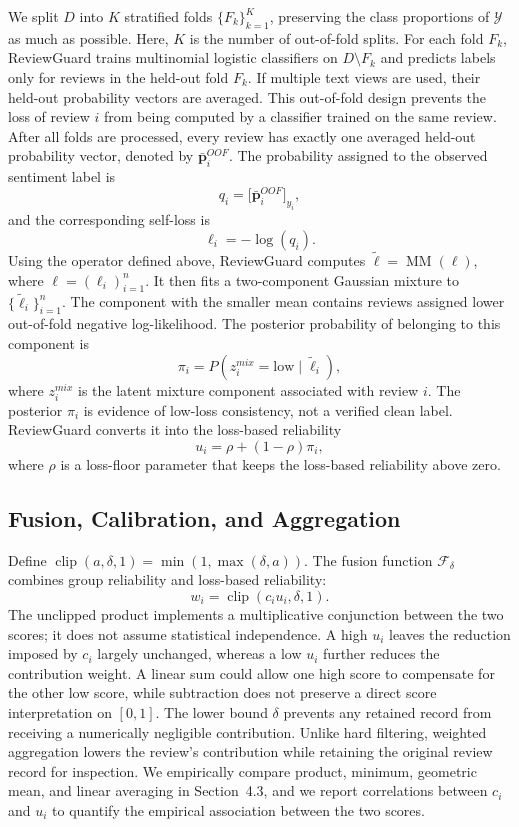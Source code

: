\documentclass[runningheads]{llncs}
\begin{document}
We split \(D\) into \(K\) stratified folds \(\{F_k\}_{k=1}^{K}\), preserving the class proportions of \(\mathcal{Y}\) as much as possible. Here, \(K\) is the number of out-of-fold splits. For each fold \(F_k\), ReviewGuard trains multinomial logistic classifiers on \(D\setminus F_k\) and predicts labels only for reviews in the held-out fold \(F_k\). If multiple text views are used, their held-out probability vectors are averaged. This out-of-fold design prevents the loss of review \(i\) from being computed by a classifier trained on the same review. After all folds are processed, every review has exactly one averaged held-out probability vector, denoted by \(\bar{\mathbf{p}}_i^{OOF}\). The probability assigned to the observed sentiment label is
\[
q_i=\bigl[\bar{\mathbf{p}}_i^{OOF}\bigr]_{y_i},
\]
and the corresponding self-loss is
\[
\ell_i=-\log(q_i).
\]
Using the operator defined above, ReviewGuard computes \(\tilde{\boldsymbol{\ell}}=\operatorname{MM}(\boldsymbol{\ell})\), where \(\boldsymbol{\ell}=(\ell_i)_{i=1}^{n}\). It then fits a two-component Gaussian mixture to \(\{\tilde{\ell}_i\}_{i=1}^{n}\). The component with the smaller mean contains reviews assigned lower out-of-fold negative log-likelihood. The posterior probability of belonging to this component is
\[
\pi_i=P(z_i^{mix}=\mathrm{low}\mid \tilde{\ell}_i),
\]
where \(z_i^{mix}\) is the latent mixture component associated with review \(i\). The posterior \(\pi_i\) is evidence of low-loss consistency, not a verified clean label. ReviewGuard converts it into the loss-based reliability
\[
u_i=\rho+(1-\rho)\pi_i,
\]
where \(\rho\) is a loss-floor parameter that keeps the loss-based reliability above zero.

\subsection{Fusion, Calibration, and Aggregation}

Define \(\operatorname{clip}(a,\delta,1)=\min(1,\max(\delta,a))\). The fusion function \(\mathcal{F}_{\delta}\) combines group reliability and loss-based reliability:
\[
w_i=\operatorname{clip}(c_i u_i,\delta,1).
\]
The unclipped product implements a multiplicative conjunction between the two scores; it does not assume statistical independence. A high \(u_i\) leaves the reduction imposed by \(c_i\) largely unchanged, whereas a low \(u_i\) further reduces the contribution weight. A linear sum could allow one high score to compensate for the other low score, while subtraction does not preserve a direct score interpretation on \([0,1]\). The lower bound \(\delta\) prevents any retained record from receiving a numerically negligible contribution. Unlike hard filtering, weighted aggregation lowers the review's contribution while retaining the original review record for inspection. We empirically compare product, minimum, geometric mean, and linear averaging in Section~4.3, and we report correlations between \(c_i\) and \(u_i\) to quantify the empirical association between the two scores.
\end{document}
